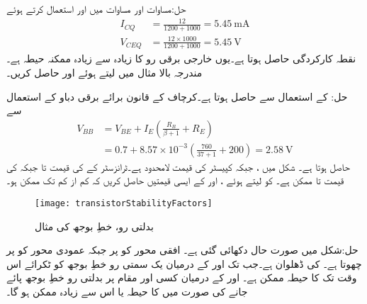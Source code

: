 حل:مساوات  اور مساوات  میں  اور  استعمال کرتے ہوئے
\begin{align*}
I_{CQ}&=\frac{12}{1200+1000}=\SI{5.45}{\milli \ampere}\\
V_{CEQ}&=\frac{12 \times 1000}{1200+1000}=\SI{5.45}{\volt}
\end{align*}
نقطہ کارکردگی حاصل ہوتا ہے۔یوں خارجی برقی رو کا زیادہ سے زیادہ ممکنہ حیطہ  ہے۔
مندرجہ بالا مثال میں  لیتے ہوئے  اور  حاصل کریں۔

حل: کے استعمال سے   حاصل ہوتا ہے۔کرچاف کے قانون برائے برقی دباو کے استعمال سے
\begin{align*}
V_{BB}&=V_{BE}+I_E \left(\frac{R_B}{\beta+1}+R_E \right)\\
&=0.7+8.57 \times 10^{-3} \left(\frac{760}{37+1}+200 \right)=\SI{2.58}{\volt}
\end{align*}
حاصل ہوتا ہے۔
شکل  میں ،  جبکہ کپیسٹر کی قیمت لامحدود ہے۔ٹرانزسٹر کے  کی قیمت  تا  جبکہ  کی قیمت  تا  ممکن ہے۔ کو  لیتے ہوئے ،  اور  کے ایسی قیمتیں حاصل کریں کہ  کم از کم  تک ممکن ہو۔ 
\begin{figure}
\centering
\texttt{[image: transistorStabilityFactors]}
\caption{بدلتی رو، خطِ بوجھ کی مثال}
\label{شکل_ٹرانزسٹر_بدلتی_رو_بار_خط_مثال}
\end{figure}

حل:شکل  میں صورت حال دکھائی گئی ہے۔ افقی محور کو  پر جبکہ عمودی محور کو  پر چھوتا ہے۔ کی ڈھلوان  ہے۔جب تک   اور  کے درمیان یک سمتی رو خطِ بوجھ کو ٹکرائے اس وقت تک  کا حیطہ  ممکن ہے۔ اور  کے درمیان کسی اور مقام پر بدلتی رو خطِ بوجھ پائے جانے کی صورت میں  کا حیطہ  یا اس سے زیادہ ممکن ہو گا۔

